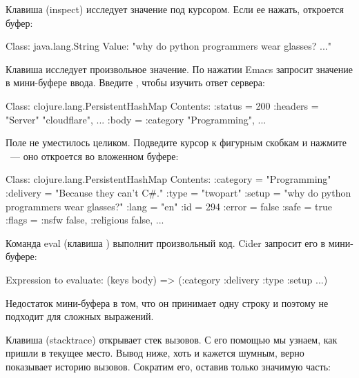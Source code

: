 Клавиша  (inspect) исследует значение под курсором. Если ее нажать, откроется буфер:

\begin{english}
  \begin{text}
Class: java.lang.String
Value: "why do python programmers wear glasses? ..."
  \end{text}
\end{english}

Клавиша  исследует произвольное значение. По нажатии Emacs запросит значение в мини-буфере ввода. Введите , чтобы изучить ответ сервера:

\begin{english}
  \begin{clojure}
Class: clojure.lang.PersistentHashMap
Contents:
  :status = 200
  :headers = { "Server" "cloudflare", ... }
  :body = { :category "Programming",  ... }
  \end{clojure}
\end{english}

Поле  не уместилось целиком. Подведите курсор к фигурным скобкам и нажмите \enter~--- оно откроется во вложенном буфере:

\begin{english}
  \begin{clojure}
Class: clojure.lang.PersistentHashMap
Contents:
  :category = "Programming"
  :delivery = "Because they can't C#."
  :type = "twopart"
  :setup = "why do python programmers wear glasses?"
  :lang = "en"
  :id = 294
  :error = false
  :safe = true
  :flags = { :nsfw false, :religious false, ... }
  \end{clojure}
\end{english}

Команда eval (клавиша ) выполнит произвольный код. Cider запросит его в мини-буфере:

\begin{english}
  \begin{text}
Expression to evaluate: (keys body)
=> (:category :delivery :type :setup ...)
  \end{text}
\end{english}

Недостаток мини-буфера в том, что он принимает одну строку и поэтому не подходит для сложных выражений.

Клавиша  (stacktrace) открывает стек вызовов. С его помощью мы узнаем, как пришли в текущее место. Вывод ниже, хоть и кажется шумным, верно показывает историю вызовов. Сократим его, оставив только значимую часть:

